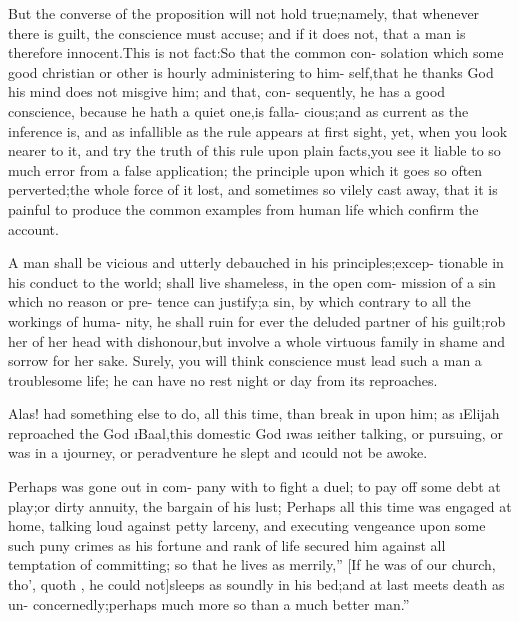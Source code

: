 \documentclass[twoside]{article}
\begin{document}
\lqq But the converse of the proposition\break
\lqq will not hold true;\tsh namely, that\break
\lqq whenever there is guilt, the conscience\break
\lqq must accuse; and if it does not, that\break
\lqq a man is therefore innocent.\tsk This is\break
\lqq not fact:\tsk So that the common con-\break
\lqq solation which some good christian or\break
\lqq other is hourly administering to him-\break
\lqq self,\tsk that he thanks God his mind\break
\lqq does not misgive him; and that, con-
\lqq sequently, he has a good conscience,\break
\lqq because he hath a quiet one,\tsk is falla-\break
\lqq cious;\tsk and as current as the inference\break
\lqq is, and as infallible as the rule appears\break
\lqq at first sight, yet, when you look nearer\break
\lqq to it, and try the truth of this rule\break
\lqq upon plain facts,\tsk you see it liable to\break
\lqq so much error from a false application;\break
\lqq \tsk the principle upon which it goes so\break
\lqq often perverted;\tsk the whole force of\break
\lqq it lost, and sometimes so vilely cast\break
\lqq away, that it is painful to produce the\break
\lqq common examples from human life\break
\lqq which confirm the account.

\lqq A man shall be vicious and utterly\break
\lqq debauched in his principles;\tsk excep-\break
\lqq tionable in his conduct to the world;\break
\lqq shall live shameless, in the open com-\break
\lqq mission of a sin which no reason or pre-\break
\lqq tence can justify;\tsk a sin, by which
\lqq contrary to all the workings of huma-\break
\lqq nity, he shall ruin for ever the deluded\break
\lqq partner of his guilt;\tsk rob her of her\break
{}\break
\lqq head with dishonour,\tsk but involve a\break
\lqq whole virtuous family in shame and\break
\lqq sorrow for her sake. Surely, you will\break
\lqq think conscience must lead such a man\break
\lqq a troublesome life; he can have no\break
\lqq rest night or day from its reproaches.

\lqq Alas!  had something\break
\lqq else to do, all this time, than break in\break
\lqq upon him; as \i{Elijah} reproached the\break
\lqq God \i{Baal},\tsh this domestic God \i{was}\break
\lqq \i{either talking, or pursuing, or was in a}\break
\lqq \i{journey, or peradventure he slept and}\break
\lqq \i{could not be awoke.}

\lqq Perhaps  was gone out in com-\break
\lqq pany with  to fight a duel;
\lqq to pay off some debt at play;\tsh or\break
\lqq dirty annuity, the bargain of his lust;\break
\lqq Perhaps  all this time was\break
\lqq engaged at home, talking loud against\break
\lqq petty larceny, and executing vengeance\break
\lqq upon some such puny crimes as his\break
\lqq fortune and rank of life secured him\break
\lqq against all temptation of committing;\break
\lqq so that he lives as merrily,” [If he was\break
of our church, tho’, quoth \drslop, he\break
could not]\tsk \lqq sleeps as soundly in his\break
\lqq bed;\tsk and at last meets death as un-\break
\lqq concernedly;\tsk perhaps much more so\break
\lqq than a much better man.”
\end{document}
